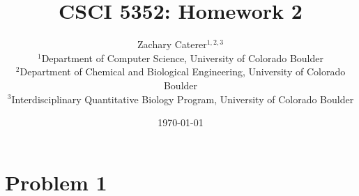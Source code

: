 \documentclass[12pt]{article}
\title{CSCI 5352: Homework 2}
\author{
    Zachary Caterer$^{1,2,3}$ \\
    \small $^1$Department of Computer Science, University of Colorado Boulder \\
    \small $^2$Department of Chemical and Biological Engineering, University of Colorado Boulder \\
    \small $^3$Interdisciplinary Quantitative Biology Program, University of Colorado Boulder
}
\date{\today}
\begin{document}
\maketitle

\section*{Problem 1}
\end{document}
